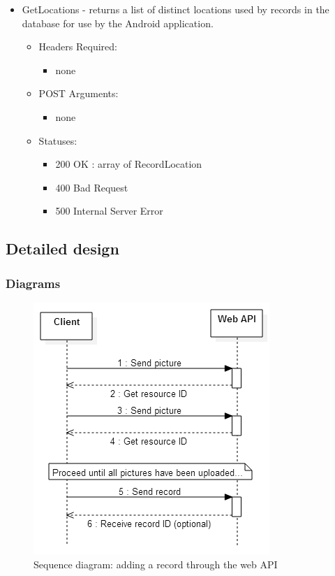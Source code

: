 \begin{itemize}
        \item GetLocations - returns a list of distinct locations used by records in the database for use by the Android application.
        \begin{itemize}
        \item Headers Required:
        \begin{itemize}
              	\item none
        \end{itemize}
        \item POST Arguments:
        \begin{itemize}
              	\item none
        \end{itemize}
        \item Statuses: 
        \begin{itemize}
              	\item 200 OK : array of RecordLocation
              	\item 400 Bad Request
              	\item 500 Internal Server Error
        \end{itemize}
	    \end{itemize}
    \end{itemize}

\subsection{Detailed design}
    \subsubsection{Diagrams}
        \begin{figure}
            \centering
            \includegraphics[scale=0.75]{server/working/SequenceDiagram-AddRecord.png}
            \caption{Sequence diagram: adding a record through the web API}
            \label{fig:addRecordSequenceDiagram}
        \end{figure}


